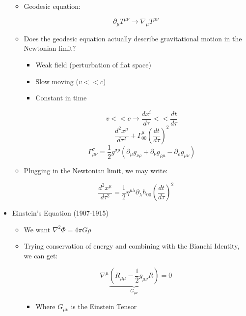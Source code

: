 \begin{itemize}
\begin{itemize}
\begin{itemize}
        \end{itemize}

      \item Geodesic equation:

        $$\partial_{\mu}T^{\mu\nu}\to \nabla_{\mu}T^{\mu\nu}$$

      \item Does the geodesic equation actually describe gravitational motion in the Newtonian limit?

        \begin{itemize}

          \item Weak field (perturbation of flat space)

          \item Slow moving ($ v<< c$)

          \item Constant in time

            $$v<<c\to \frac{dx^i}{d\tau}<<\frac{dt}{d\tau}$$
            $$\frac{d^2x^{\mu}}{d\tau^2}+\Gamma^{\mu}_{00}\left( \frac{dt}{d\tau} \right)^2$$
            $$\Gamma ^{\sigma}_{\mu\nu}=\frac{1}{2}g^{\sigma\rho}(\partial_{\mu}g_{\nu\rho}+\partial_{\nu}g_{\rho\mu}-\partial_{\rho}g_{\mu\nu})$$

        \end{itemize}

      \item Plugging in the Newtonian limit, we may write:

        $$\frac{d^2x^{\mu}}{d\tau^2}=\frac{1}{2}\eta^{\mu\lambda}\partial_{\lambda}h_{00}\left( \frac{dt}{d\tau} \right)^2$$

    \end{itemize}

  \item Einstein's Equation (1907-1915)

    \begin{itemize}

      \item We want $\nabla^2\Phi=4\pi G\rho$

      \item Trying conservation of energy and combining with the Bianchi Identity, we can get:

        $$\nabla^{\mu}\underbrace{(R_{\mu\mu}-\frac{1}{2}g_{\mu\nu}R)}_{G_{\mu\nu}}=0$$

        \begin{itemize}

          \item Where $G_{\mu\nu}$ is the Einstein Tensor


\end{itemize}
\end{itemize}
\end{itemize}
